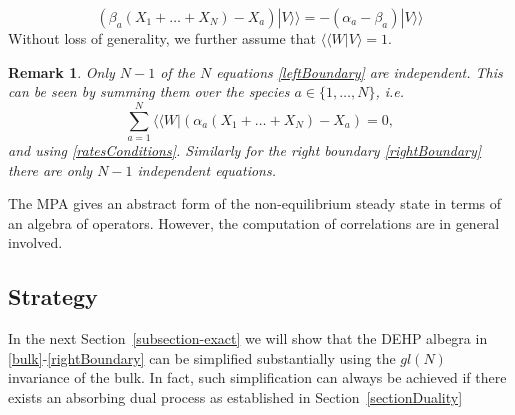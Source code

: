 \documentclass[10pt]{article}
\numberwithin{equation}{section}
\numberwithin{equation}{subsection}
\newtheorem{remark}{Remark}
\newcommand{\dt}{\;.}
\begin{document}
\begin{equation}\label{rightBoundary}
	\left(\beta_{a}(X_{1}+\ldots+X_{N})-X_{a}\right) |V\rangle\rangle =-(\alpha_{a}-\beta_{a}) |V\rangle\rangle %
\end{equation}
Without loss of generality, we further assume that $ \langle \langle W|  V\rangle=1$. 
\begin{remark} Only $N-1$ of the $N$ equations \eqref{leftBoundary}  are independent. This can be seen by summing them over the species $a\in \{1,\ldots,N\}$, i.e.
	\begin{equation}
		\sum_{a=1}^{N}	 \langle \langle W|  \left(\alpha_{a}(X_{1}+\ldots+X_{N})-X_{a}\right)=0,%
	\end{equation}
	and using  \eqref{ratesConditions}.
 Similarly for the right boundary  \eqref{rightBoundary} there are only  $N-1$ independent equations. \end{remark} 
The MPA gives an abstract form of the non-equilibrium steady state in terms of an algebra of operators. However, the computation of  correlations are in general involved. 

\subsection{Strategy}
 In the next Section~\ref{subsection-exact} we will show that the DEHP albegra in \eqref{bulk}-\eqref{rightBoundary} can be simplified substantially using the ${gl}(N)$ invariance of the bulk. In fact, such simplification can always be achieved if 
  there exists an absorbing dual process as established in Section~\ref{sectionDuality}
 
\end{document}
